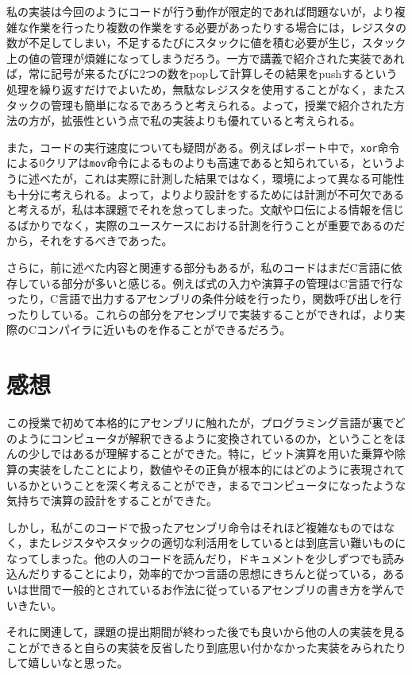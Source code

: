 \documentclass[a4paper]{jsarticle}
\newcommand{\var}[1]{\texttt{#1}}
\begin{document}
私の実装は今回のようにコードが行う動作が限定的であれば問題ないが，より複雑な作業を行ったり複数の作業をする必要があったりする場合には，レジスタの数が不足してしまい，不足するたびにスタックに値を積む必要が生じ，スタック上の値の管理が煩雑になってしまうだろう。一方で講義で紹介された実装であれば，常に記号が来るたびに2つの数をpopして計算しその結果をpushするという処理を繰り返すだけでよいため，無駄なレジスタを使用することがなく，またスタックの管理も簡単になるであろうと考えられる。よって，授業で紹介された方法の方が，拡張性という点で私の実装よりも優れていると考えられる。

また，コードの実行速度についても疑問がある。例えばレポート中で，\var{xor}命令による0クリアは\var{mov}命令によるものよりも高速であると知られている，というように述べたが，これは実際に計測した結果ではなく，環境によって異なる可能性も十分に考えられる。よって，よりより設計をするためには計測が不可欠であると考えるが，私は本課題でそれを怠ってしまった。文献や口伝による情報を信じるばかりでなく，実際のユースケースにおける計測を行うことが重要であるのだから，それをするべきであった。

さらに，前に述べた内容と関連する部分もあるが，私のコードはまだC言語に依存している部分が多いと感じる。例えば式の入力や演算子の管理はC言語で行なったり，C言語で出力するアセンブリの条件分岐を行ったり，関数呼び出しを行ったりしている。これらの部分をアセンブリで実装することができれば，より実際のCコンパイラに近いものを作ることができるだろう。

\section{感想}
この授業で初めて本格的にアセンブリに触れたが，プログラミング言語が裏でどのようにコンピュータが解釈できるように変換されているのか，ということをほんの少しではあるが理解することができた。特に，ビット演算を用いた乗算や除算の実装をしたことにより，数値やその正負が根本的にはどのように表現されているかということを深く考えることができ，まるでコンピュータになったような気持ちで演算の設計をすることができた。

しかし，私がこのコードで扱ったアセンブリ命令はそれほど複雑なものではなく，またレジスタやスタックの適切な利活用をしているとは到底言い難いものになってしまった。他の人のコードを読んだり，ドキュメントを少しずつでも読み込んだりすることにより，効率的でかつ言語の思想にきちんと従っている，あるいは世間で一般的とされているお作法に従っているアセンブリの書き方を学んでいきたい。

それに関連して，課題の提出期間が終わった後でも良いから他の人の実装を見ることができると自らの実装を反省したり到底思い付かなかった実装をみられたりして嬉しいなと思った。
\end{document}
